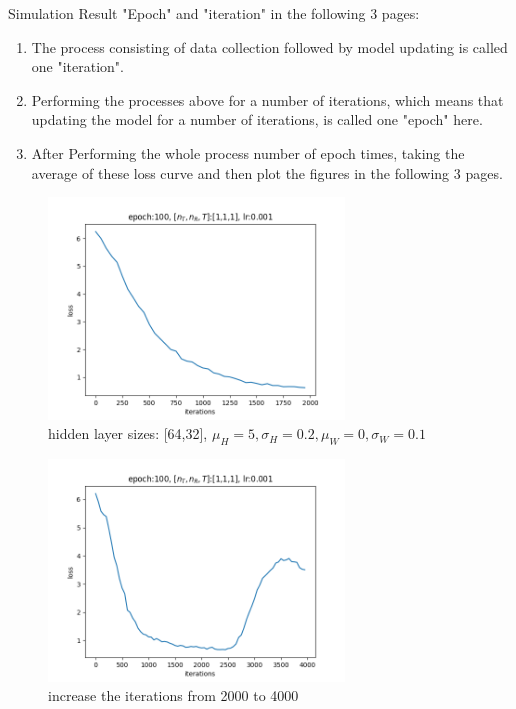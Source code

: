 \documentclass[hyperref={bookmarks=false}]{beamer}
\numberwithin{figure}{section}
\begin{document}
\begin{frame}[allowframebreaks]{Simulation Result}
"Epoch" and "iteration" in the following 3 pages:\\
\begin{enumerate}
    \item The process consisting of data collection followed
        by model updating is called one "iteration".\\
    \item Performing the processes above for a number of 
        iterations, which means that updating the model for a 
        number of iterations, is called one "epoch" here.\\
    \item After Performing the whole process number of 
        epoch times, taking the average of these loss curve 
        and then plot the figures in the following 3 pages. 
\end{enumerate}


\framebreak

\begin{figure}[h]
    \includegraphics[width=0.7\textwidth]{Figure_1.png}
    \caption{hidden layer sizes: [64,32], $\mu_H=5, \sigma_H=0.2, \mu_W=0, \sigma_W=0.1 $}
\end{figure}

\framebreak

\begin{figure}
    \includegraphics[width=0.7\textwidth]{Figure_2.png}
    \caption{increase the iterations from 2000 to 4000}
\end{figure}


\end{frame}
\end{document}
